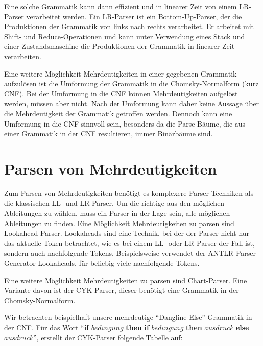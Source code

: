\documentclass[runningheads]{llncs}
\begin{document}
	Eine solche Grammatik kann dann effizient und in linearer Zeit von einem LR-Parser verarbeitet werden.
	Ein LR-Parser ist ein Bottom-Up-Parser, der die Produktionen der Grammatik von links nach rechts verarbeitet.
	Er arbeitet mit Shift- und Reduce-Operationen und kann unter Verwendung eines Stack und einer Zustandsmaschine
	die Produktionen der Grammatik in linearer Zeit verarbeiten.

	Eine weitere Möglichkeit Mehrdeutigkeiten in einer gegebenen Grammatik aufzulösen
	ist die Umformung der Grammatik in die Chomsky-Normalform (kurz CNF).
	Bei der Umformung in die CNF können Mehrdeutigkeiten aufgelöst werden, müssen aber nicht.
	Nach der Umformung kann daher keine Aussage über die Mehrdeutigkeit der Grammatik getroffen werden.
	Dennoch kann eine Umformung in die CNF sinnvoll sein, besonders da die Parse-Bäume,
	die aus einer Grammatik in der CNF resultieren, immer Binärbäume sind.



	\section{Parsen von Mehrdeutigkeiten}\label{sec:parsen-von-mehrdeutigkeiten}

	Zum Parsen von Mehrdeutigkeiten benötigt es komplexere Parser-Techniken als die klassischen LL- und LR-Parser.
	Um die richtige aus den möglichen Ableitungen zu wählen,
	muss ein Parser in der Lage sein, alle möglichen Ableitungen zu finden.
	Eine Möglichkeit Mehrdeutigkeiten zu parsen sind Lookahead-Parser.
	Lookaheads sind eine Technik, bei der der Parser nicht nur das aktuelle Token betrachtet,
	wie es bei einem LL- oder LR-Parser der Fall ist, sondern auch nachfolgende Tokens.
	Beispielsweise verwendet der ANTLR-Parser-Generator Lookaheads,
	für beliebig viele nachfolgende Tokens.

	Eine weitere Möglichkeit Mehrdeutigkeiten zu parsen sind Chart-Parser.
	Eine Variante davon ist der CYK-Parser,
	dieser benötigt eine Grammatik in der Chomsky-Normalform.

	Wir betrachten beispielhaft unsere mehrdeutige ``Dangline-Else''-Grammatik in der CNF.
	Für das Wort ``\textbf{if} $bedingung$ \textbf{then} \textbf{if} $bedingung$ \textbf{then} $ausdruck$ \textbf{else} $ausdruck$'',
	erstellt der CYK-Parser folgende Tabelle auf:
\end{document}
